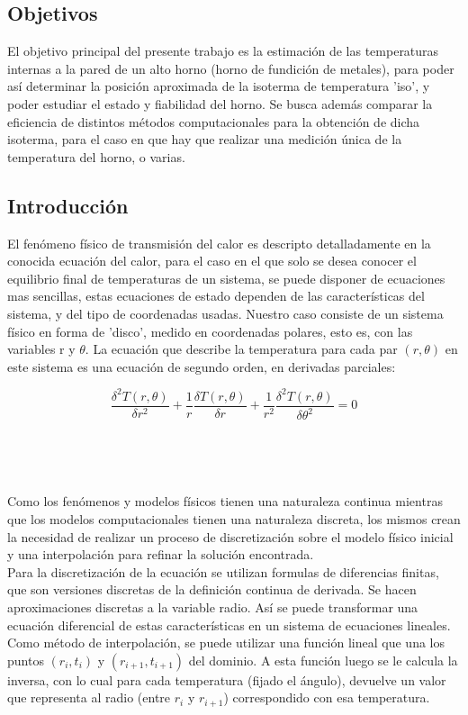 \subsection{Objetivos}
El objetivo principal del presente trabajo es la estimaci\'on de las temperaturas internas a la pared de un alto horno (horno de fundición de metales), para poder así determinar la posición aproximada de la isoterma de temperatura 'iso', y poder estudiar el estado y fiabilidad del horno. 
Se busca adem\'as comparar la eficiencia de distintos m\'etodos computacionales para la obtención de dicha isoterma, para el caso en que hay que realizar una medición \'unica de la temperatura del horno, o varias.

\subsection{Introducción}
El fen\'omeno físico de transmisión del calor es descripto detalladamente en la conocida ecuación del calor, para el caso en el que solo se desea conocer el equilibrio final de temperaturas de un sistema, se puede disponer de ecuaciones mas sencillas, estas ecuaciones de estado dependen de las caracter\'isticas del sistema, y del tipo de coordenadas usadas. Nuestro caso consiste de un sistema físico en forma de 'disco', medido en coordenadas polares, esto es, con las variables r y $\theta$. La ecuación que describe la temperatura para cada par $(r, \theta)$ en este sistema es una ecuación de segundo orden, en derivadas parciales:

$$\frac{\delta ^{2} T(r, \theta)}{\delta r^{2}} + \frac{1}{r} \frac{\delta T (r,\theta)}{\delta r} + \frac{1}{r^{2}} \frac{\delta^{2} T(r,\theta)}{\delta \theta ^{2}} = 0$$

~

~

Como los fen\'omenos y modelos físicos tienen una naturaleza continua mientras que los modelos computacionales tienen una naturaleza discreta, los mismos crean la necesidad de realizar un proceso de discretizaci\'on sobre el modelo físico inicial y una interpolación para refinar la solución encontrada.
\\
Para la discretización de la ecuación se utilizan formulas de diferencias finitas, que son versiones discretas de la definición continua de derivada. Se hacen aproximaciones discretas a la variable radio. Así se puede transformar una ecuación diferencial de estas caracter\'isticas en un sistema de ecuaciones lineales.
\\
Como m\'etodo de interpolación, se puede utilizar una función lineal que una los puntos $(r_{i}, t_{i})$ y $(r_{i+1}, t_{i+1})$ del dominio. A esta función luego se le calcula la inversa, con lo cual para cada temperatura (fijado el \'angulo), devuelve un valor que representa al radio (entre $r_{i}$ y $r_{i+1}$)  correspondido con esa temperatura.

